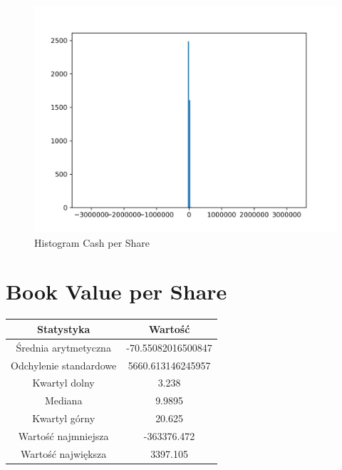 \documentclass{article}
\begin{document}
\begin{figure}[h!]
    \includegraphics[width=\linewidth]{variables/Cash per Share.png}
    \caption{Histogram Cash per Share }
\end{figure}\section{ Book Value per Share }

\begin{center}
    \begin{tabular}{|c | c|} 
    \hline
    Statystyka & Wartość \\
    \hline\hline
    Średnia arytmetyczna & -70.55082016500847 \\ 
    \hline
    Odchylenie standardowe & 5660.613146245957 \\
    \hline
    Kwartyl dolny & 3.238 \\
    \hline
    Mediana & 9.9895 \\
    \hline
    Kwartyl górny & 20.625 \\
    \hline
    Wartość najmniejsza & -363376.472 \\
    \hline
    Wartość największa & 3397.105 \\
    \hline
   \end{tabular}
\end{center}
\end{document}
